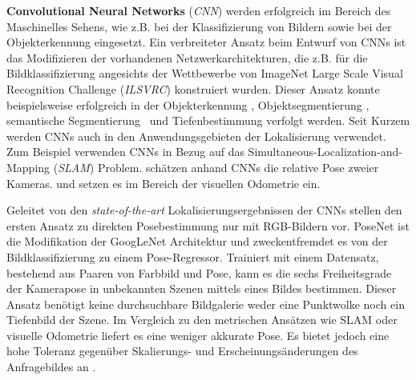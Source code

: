\textbf{Convolutional Neural Networks} (\textit{CNN}) werden erfolgreich im Bereich des Maschinelles Sehens, wie z.B. bei der Klassifizierung von Bildern \cite{krizhevskyImageNetClassificationDeep2012, simonyanVeryDeepConvolutional2014, heDeepResidualLearning2015} sowie bei der Objekterkennung \cite{girshickRichFeatureHierarchies2013, renFasterRCNNRealTime2015b, girshickFastRCNN2015} eingesetzt. 
Ein verbreiteter Ansatz beim Entwurf von CNNs ist das Modifizieren der vorhandenen Netzwerkarchitekturen, die z.B. für die Bildklassifizierung angesichts der Wettbewerbe von ImageNet Large Scale Visual Recognition Challenge (\textit{ILSVRC}) \cite{russakovskyImageNetLargeScale2015} konstruiert wurden. Dieser Ansatz konnte beispielsweise erfolgreich in der Objekterkennung \cite{girshickFastRCNN2015}, Objektsegmentierung \cite{kokkinosPushingBoundariesBoundary2015, maninisConvolutionalOrientedBoundaries2016}, semantische Segmentierung \cite{nohLearningDeconvolutionNetwork2015, hazirbasFuseNetIncorporatingDepth2017a} und Tiefenbestimmung \cite{liDepthSurfaceNormal2015} verfolgt werden.
Seit Kurzem werden CNNs auch in den Anwendungsgebieten der Lokalisierung verwendet. Zum Beispiel verwenden  \citet{parisottoGlobalPoseEstimation2018} CNNs in Bezug auf das Simultaneous-Localization-and-Mapping (\textit{SLAM}) Problem. \citet{melekhovRelativeCameraPose2017} schätzen anhand CNNs die relative Pose zweier Kameras. \citet{costanteExploringRepresentationLearning2016} und \citet{wangDeepVOEndtoendVisual2017} setzen es im Bereich der visuellen Odometrie ein.

Geleitet von den \textit{state-of-the-art} Lokalisierungsergebnissen der CNNs stellen \citet{kendallPoseNetConvolutionalNetwork2015} den ersten Ansatz zu direkten Posebestimmung nur mit RGB-Bildern vor. PoseNet ist die Modifikation der GoogLeNet \cite{szegedyGoingDeeperConvolutions2015} Architektur und zweckentfremdet es von der Bildklassifizierung zu einem Pose-Regressor. Trainiert mit einem Datensatz, bestehend aus Paaren von Farbbild und Pose, kann es die sechs Freiheitsgrade der Kamerapose in unbekannten Szenen mittels eines Bildes bestimmen. Dieser Ansatz benötigt keine durchsuchbare Bildgalerie weder eine Punktwolke noch ein Tiefenbild der Szene. Im Vergleich zu den metrischen Ansätzen wie SLAM oder visuelle Odometrie liefert es eine weniger akkurate Pose. Es bietet jedoch eine hohe Toleranz gegenüber Skalierungs- und Erscheinungsänderungen des Anfragebildes an \cite{piascoSurveyVisualBasedLocalization2018}.

